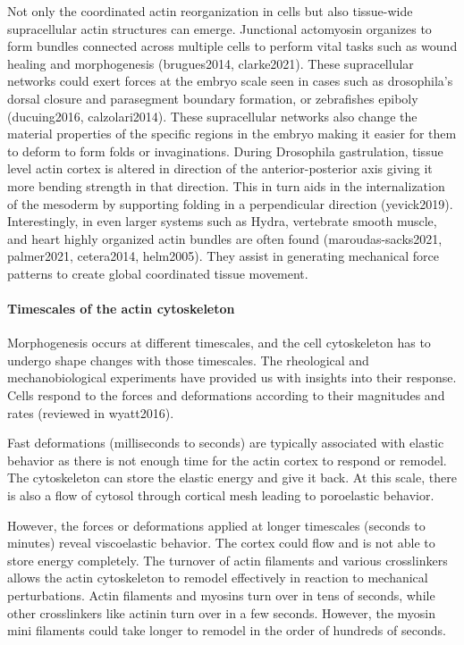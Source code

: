 \documentclass[
]{article}
\begin{document}
Not only the coordinated actin reorganization in cells but also
tissue-wide supracellular actin structures can emerge. Junctional
actomyosin organizes to form bundles connected across multiple cells to
perform vital tasks such as wound healing and morphogenesis
(brugues2014, clarke2021). These supracellular networks could exert
forces at the embryo scale seen in cases such as drosophila's dorsal
closure and parasegment boundary formation, or zebrafishes epiboly
(ducuing2016, calzolari2014). These supracellular networks also change
the material properties of the specific regions in the embryo making it
easier for them to deform to form folds or invaginations. During
Drosophila gastrulation, tissue level actin cortex is altered in
direction of the anterior-posterior axis giving it more bending strength
in that direction. This in turn aids in the internalization of the
mesoderm by supporting folding in a perpendicular direction
(yevick2019). Interestingly, in even larger systems such as Hydra,
vertebrate smooth muscle, and heart highly organized actin bundles are
often found (maroudas-sacks2021, palmer2021, cetera2014, helm2005). They
assist in generating mechanical force patterns to create global
coordinated tissue movement.

\hypertarget{timescales-of-the-actin-cytoskeleton}{%
\paragraph{Timescales of the actin
cytoskeleton}\label{timescales-of-the-actin-cytoskeleton}}

Morphogenesis occurs at different timescales, and the cell cytoskeleton
has to undergo shape changes with those timescales. The rheological and
mechanobiological experiments have provided us with insights into their
response. Cells respond to the forces and deformations according to
their magnitudes and rates (reviewed in wyatt2016).

Fast deformations (milliseconds to seconds) are typically associated
with elastic behavior as there is not enough time for the actin cortex
to respond or remodel. The cytoskeleton can store the elastic energy and
give it back. At this scale, there is also a flow of cytosol through
cortical mesh leading to poroelastic behavior.

However, the forces or deformations applied at longer timescales
(seconds to minutes) reveal viscoelastic behavior. The cortex could flow
and is not able to store energy completely. The turnover of actin
filaments and various crosslinkers allows the actin cytoskeleton to
remodel effectively in reaction to mechanical perturbations. Actin
filaments and myosins turn over in tens of seconds, while other
crosslinkers like actinin turn over in a few seconds. However, the
myosin mini filaments could take longer to remodel in the order of
hundreds of seconds.
\end{document}
